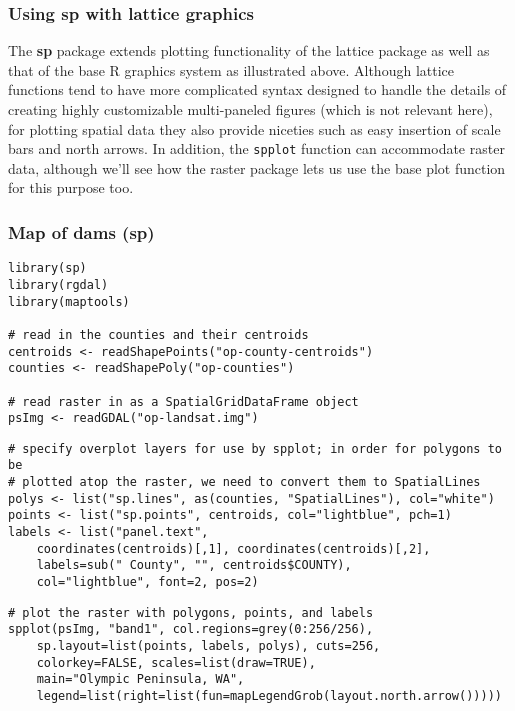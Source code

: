 \documentclass{beamer}
\begin{document}
\begin{frame}
\frametitle{Using sp with lattice graphics}
The \textbf{sp} package extends plotting functionality of the lattice package as well as that of the base R graphics system as illustrated above. Although lattice functions tend to have more complicated syntax designed to handle the details of creating highly customizable multi-paneled figures (which is not relevant here), for plotting spatial data they also provide niceties such as easy insertion of scale bars and north arrows. In addition, the \texttt{spplot} function can accommodate raster data, although we'll see how the raster package lets us use the base plot function for this purpose too.
\end{frame}
\begin{frame}[fragile]
\frametitle{Map of dams (sp)}

\begin{framed}
\begin{verbatim}
library(sp)
library(rgdal)
library(maptools)
 
# read in the counties and their centroids
centroids <- readShapePoints("op-county-centroids")
counties <- readShapePoly("op-counties")
 
# read raster in as a SpatialGridDataFrame object
psImg <- readGDAL("op-landsat.img")
\end{verbatim}
\end{framed}
\end{frame}
\begin{frame}[fragile] 
\begin{framed}
\begin{verbatim} 
# specify overplot layers for use by spplot; in order for polygons to be
# plotted atop the raster, we need to convert them to SpatialLines
polys <- list("sp.lines", as(counties, "SpatialLines"), col="white")
points <- list("sp.points", centroids, col="lightblue", pch=1)
labels <- list("panel.text",
    coordinates(centroids)[,1], coordinates(centroids)[,2],
    labels=sub(" County", "", centroids$COUNTY),
    col="lightblue", font=2, pos=2)
\end{verbatim}
\end{framed}
\end{frame}
\begin{frame}[fragile] 
\begin{framed}
\begin{verbatim} 
# plot the raster with polygons, points, and labels
spplot(psImg, "band1", col.regions=grey(0:256/256),
    sp.layout=list(points, labels, polys), cuts=256,
    colorkey=FALSE, scales=list(draw=TRUE),
    main="Olympic Peninsula, WA",
    legend=list(right=list(fun=mapLegendGrob(layout.north.arrow()))))
\end{verbatim}
\end{framed}
\end{frame}
\end{document}
